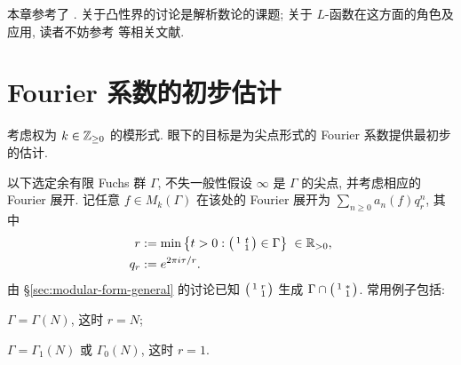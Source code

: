 本章参考了 \cite[\S 5.9]{DS05}. 关于凸性界的讨论是解析数论的课题; 关于 $L$-函数在这方面的角色及应用, 读者不妨参考 \cite{IS00,M07} 等相关文献.

\section{Fourier 系数的初步估计}\label{sec:Fourier-estimate}
考虑权为 $k \in \mathbb{Z}_{\geq 0}$ 的模形式. 眼下的目标是为尖点形式的 Fourier 系数提供最初步的估计.

以下选定余有限 Fuchs 群 $\Gamma$, 不失一般性假设 $\infty$ 是 $\Gamma$ 的尖点, 并考虑相应的 Fourier 展开. 记任意 $f \in M_k(\Gamma)$ 在该处的 Fourier 展开为 $\sum_{n \geq 0} a_n(f) q_r^n$, 其中
\begin{align*}
	r & := \min\left\{ t > 0 : \bigl(\begin{smallmatrix} 1 & t \\  & 1 \end{smallmatrix}\bigr) \in \Gamma \right\} \;\in \mathbb{R}_{>0}, \\
	q_r & := e^{2\pi i\tau/r}.
\end{align*}
由 \S\ref{sec:modular-form-general} 的讨论已知 $\bigl(\begin{smallmatrix} 1 & r \\  & 1 \end{smallmatrix}\bigr)$ 生成 $\Gamma \cap \bigl(\begin{smallmatrix} 1 & * \\  & 1 \end{smallmatrix}\bigr)$. 常用例子包括:
\begin{compactitem}
	\item $\Gamma = \Gamma(N)$, 这时 $r = N$;
	\item $\Gamma = \Gamma_1(N)$ 或 $\Gamma_0(N)$, 这时 $r = 1$.
\end{compactitem}

